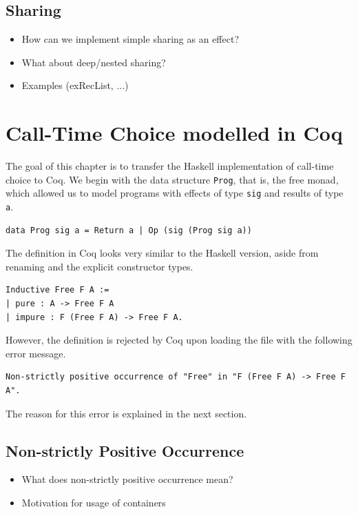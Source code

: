 \documentclass[a4paper, 11pt, fleqn, twoside]{scrreprt}
\begin{document}
\section{Sharing}
\begin{itemize}
\item How can we implement simple sharing as an effect?
\item What about deep/nested sharing?
\item Examples (exRecList, ...)
\end{itemize}


\chapter{Call-Time Choice modelled in Coq}
The goal of this chapter is to transfer the Haskell implementation of call-time 
choice to Coq. We begin with the data structure \texttt{Prog}, 
that is, the free monad, which allowed us to model programs with effects of 
type \texttt{sig} and results of type \texttt{a}.

\begin{verbatim}
data Prog sig a = Return a | Op (sig (Prog sig a))
\end{verbatim}

The definition in Coq looks very similar to the Haskell version, aside from 
renaming and the explicit constructor types.

\begin{verbatim}
Inductive Free F A :=
| pure : A -> Free F A
| impure : F (Free F A) -> Free F A.
\end{verbatim}

However, the definition is rejected by Coq upon loading the file with the 
following error message.

\begin{verbatim}
Non-strictly positive occurrence of "Free" in "F (Free F A) -> Free F A".
\end{verbatim}

The reason for this error is explained in the next section.

\section{Non-strictly Positive Occurrence}
\begin{itemize}
\item What does non-strictly positive occurrence mean?
\item Motivation for usage of containers
\end{itemize}
\end{document}
